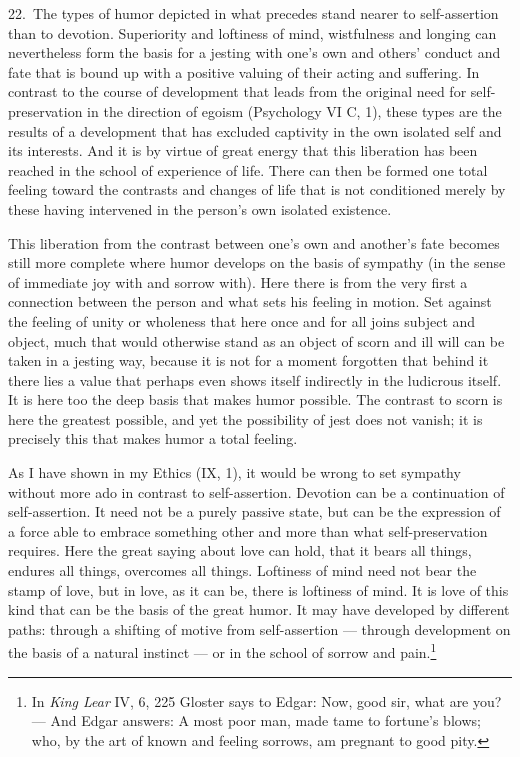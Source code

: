 \documentclass[12pt]{book}
\newcommand{\opage}[1]{\marginnote{\footnotesize\textit{[#1]}}}
\begin{document}
22.~The types of humor depicted in what precedes stand nearer to self-assertion than
to devotion. Superiority and loftiness of mind, wistfulness and longing can
nevertheless form the basis for a jesting with one's own and others' conduct and fate
that is bound up with a positive valuing of their acting and suffering. In contrast to
the course of development that leads from the original need for self-preservation in
the direction of egoism (Psychology VI C, 1), these types are the results of a
development that has excluded captivity in the own isolated self and its interests. And
it is by virtue of great energy that this liberation has been reached in the school of
experience of life. There can then be formed one total feeling toward the contrasts and
changes of life that is not conditioned merely by these having intervened in the
person's own isolated existence.

This liberation from the contrast between one's own and another's fate becomes still
more complete where humor develops on the basis of sympathy (in the sense of immediate
joy with and sorrow with). Here there is from the very first a connection between the
person and what sets his feeling in motion. Set against the feeling of unity %
or wholeness that here once and for all joins subject and object, much
that would otherwise stand as an object of scorn and ill will can be taken in a jesting
way, because it is not for a moment forgotten that behind it there lies a value that
perhaps even shows itself indirectly in the ludicrous itself. It is here too the deep
basis that makes humor possible. The contrast to scorn is here the greatest possible,
and yet the possibility of jest does not vanish; it is precisely this that makes humor
a total feeling.

As I have shown in my Ethics (IX, 1), it would be wrong to set sympathy without more
ado in contrast to self-assertion. Devotion can be a continuation of self-assertion. It
need not be a purely passive state, but can be the expression of a force able to
embrace something other and more than what self-preservation requires. Here the great
saying about love can hold, that it bears all things, endures all things, overcomes
\opage{85}all things. Loftiness of mind need not bear the stamp of love, but in love,
as it can be, there is loftiness of mind. It is love of this kind that can be the basis
of the great humor. It may have developed by different paths: through a shifting of
motive from self-assertion --- through development on the basis of a natural instinct
--- or in the school of sorrow and pain.\footnote{In \textit{King Lear} IV, 6, 225
Gloster says to Edgar: Now, good sir, what are you? --- And Edgar answers: A most poor
man, made tame to fortune's blows; who, by the art of known and feeling sorrows, am
pregnant to good pity.}
\end{document}

